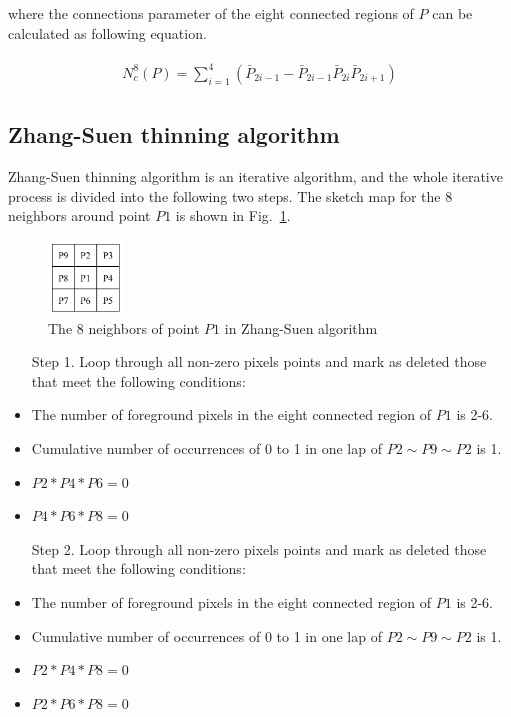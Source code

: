 \documentclass[hyperref]{article}
\theoremstyle{nonumberplain}
\begin{document}
	where the connections parameter of the eight connected regions of $P$ can be calculated as following equation.
	
	\begin{equation}
	\begin{split}
	\begin{aligned}
	N_{c}^{8}(P)=\sum_{i=1}^{4}(\bar{P}_{2i-1}-\bar{P}_{2i-1}\bar{P}_{2i}\bar{P}_{2i+1})
	\end{aligned}
	\end{split}
	\label{eq10}
	\end{equation}
	
	\subsection{Zhang-Suen thinning algorithm}
	
	\hspace{1.0em}
	Zhang-Suen thinning algorithm is an iterative algorithm, and the whole iterative process is divided into the following two steps. The sketch map for the 8 neighbors around point $P1$ is shown in Fig.~\ref{fig11}.
	
	\begin{figure}[htbp]
		\centering
		\centering
		\includegraphics[width=2cm]{Zhang-Suen.png}
		\caption{The 8 neighbors of point $P1$ in Zhang-Suen algorithm}
		\label{fig11}
	\end{figure}
	
	\begin{itemize}
		\item[Step 1.] Loop through all non-zero pixels points and mark as deleted those that meet the following conditions:
			\item The number of foreground pixels in the eight connected region of $P1$ is 2-6.
			\item Cumulative number of occurrences of 0 to 1 in one lap of $P2 \sim P9 \sim P2$ is 1.
			\item $P2\ast P4\ast P6=0$
			\item $P4\ast P6\ast P8=0$
		\item[Step 2.] Loop through all non-zero pixels points and mark as deleted those that meet the following conditions:
			\item The number of foreground pixels in the eight connected region of $P1$ is 2-6.
			\item Cumulative number of occurrences of 0 to 1 in one lap of $P2 \sim P9 \sim P2$ is 1.
			\item $P2\ast P4\ast P8=0$
			\item $P2\ast P6\ast P8=0$
	\end{itemize}
\end{document}

